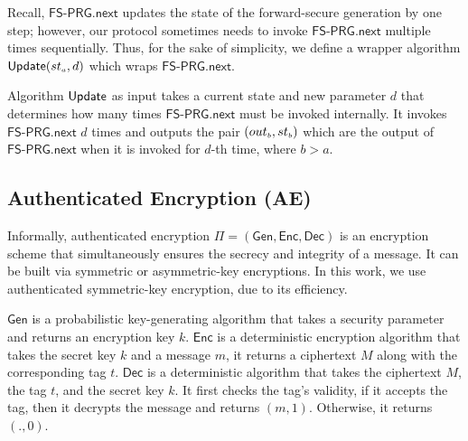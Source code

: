 Recall, $\mathsf{FS\text{-}PRG.next}$ updates the state of the forward-secure generation by one step; however, our protocol sometimes needs to invoke $\mathsf{FS\text{-}PRG.next}$ multiple times sequentially. Thus, for the sake of simplicity, we define a wrapper algorithm $ \mathsf{Update}({st}_{\scriptscriptstyle a}, d)$ which wraps  $\mathsf{FS\text{-}PRG.next}$. 

Algorithm $\mathsf{Update}$  as input takes a current state and new parameter $d$ that determines how many times   $\mathsf{FS\text{-}PRG.next}$ must be invoked internally. It invokes  $\mathsf{FS\text{-}PRG.next}$ $d$ times and outputs the pair  $({out}_{\scriptscriptstyle b}, {st}_{\scriptscriptstyle b})$  which are the output of $\mathsf{FS\text{-}PRG.next}$ when it is invoked for $d$-th time, where $ b> a$. 




\subsection{Authenticated Encryption (AE)} 

Informally, authenticated encryption $\Pi=(\mathsf{Gen}, \mathsf{Enc}, \mathsf{Dec})$ is an encryption scheme that simultaneously ensures the secrecy and integrity of a message. It can be built via symmetric or asymmetric-key encryptions. In this work, we use authenticated symmetric-key encryption, due to its efficiency. 

$\mathsf{Gen}$ is a probabilistic key-generating algorithm that takes a security parameter and returns an encryption key $k$. $\mathsf{Enc}$ is a deterministic encryption algorithm that takes the secret key $k$ and a message $m$, it returns a ciphertext $M$ along with the corresponding tag $t$. $\mathsf{Dec}$ is a deterministic algorithm that takes the ciphertext $M$, the tag $t$, and the secret key $k$. It first checks the tag's validity, if it accepts the tag, then it decrypts the message and returns $(m,1)$. Otherwise, it returns $(.,0)$. 


